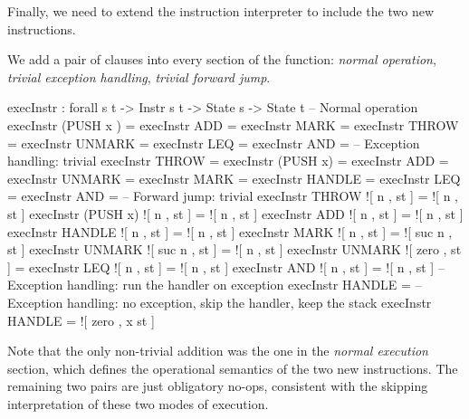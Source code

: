 Finally, we need to extend the instruction interpreter to include the two new
instructions.

We add a pair of clauses into every section of the function: \emph{normal
operation}, \emph{trivial exception handling}, \emph{trivial forward jump}.

\begin{codei}
  execInstr : forall {s t} -> Instr s t -> State s -> State t
  -- Normal operation
  execInstr (PUSH  x ) \tick[         	st ] = \tick[ x \scons st ]
  execInstr  ADD        = \tick[ (x + y) \scons st ]
  execInstr  MARK      \tick[          	st ] = 
  execInstr  THROW     \tick[          	st ] = 
  execInstr  UNMARK     = \tick[ x \scons st ]
  execInstr  LEQ        = 
  execInstr  AND        = 
  -- Exception handling: trivial
  execInstr  THROW		\x[     n , st ] = \x[     n , st ]
  execInstr (PUSH x)	\x[     n , st ] = \x[     n , st ]
  execInstr  ADD		\x[     n , st ] = \x[     n , st ]
  execInstr  UNMARK		\x[     n , st ] = \x[     n , st ]
  execInstr  MARK		\x[     n , st ] = \x[ suc n , st ]
  execInstr  HANDLE		\x[ suc n , st ] = \x[     n , st ]
  execInstr  LEQ		\x[     n , st ] = \x[     n , st ]
  execInstr  AND		\x[     n , st ] = \x[     n , st ]
  -- Forward jump: trivial
  execInstr  THROW		![ n , st ] = ![ n , st ]
  execInstr (PUSH x)	![ n , st ] = ![ n , st ]
  execInstr  ADD		![ n , st ] = ![ n , st ]
  execInstr  HANDLE		![ n , st ] = ![ n , st ]
  execInstr  MARK		![     n , st ] = ![ suc n , st ]
  execInstr  UNMARK		![ suc n , st ] = ![     n , st ]
  execInstr  UNMARK		![ zero  , st ] = \tick[ st ]
  execInstr  LEQ		![ n , st ] = ![ n , st ]
  execInstr  AND		![ n , st ] = ![ n , st ]
  -- Exception handling: run the handler on exception
  execInstr  HANDLE		\x[ zero , st ] = \tick[ st ]
  -- Exception handling: no exception, skip the handler, keep the stack
  execInstr  HANDLE		 = ![ zero , x \scons st ]
\end{codei}

\noindent Note that the only non-trivial addition was the one in the
\emph{normal execution} section, which defines the operational semantics of the
two new instructions. The remaining two pairs are just obligatory no-ops,
consistent with the skipping interpretation of these two modes of execution.

